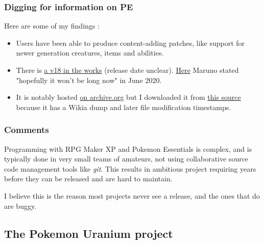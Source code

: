 \documentclass[11pt]{article}
\begin{document}
\subsubsection{Digging for information on PE}

Here are some of my findings :

\begin{itemize}
\item Users have been able to produce content-adding patches, like support for newer generation creatures, items and abilities.

\item There is \href{https://www.reddit.com/r/PokemonRMXP/comments/ckeaov/pok\%C3\%A9mon\_essentials\_v18\_progress\_report/}{a v18 in the works} (release date unclear). \href{https://www.reddit.com/r/PokemonRMXP/comments/hb6i6m/should\_i\_wait\_for\_essentials\_v18/}{Here} Maruno stated "hopefully it won't be long now" in June 2020.

\item It is notably hosted  \href{https://archive.org/details/PokmonEssentialsV17.220171015}{on archive.org} but I downloaded it from \href{https://www.youtube.com/watch?v=-aLAoeZnRDw}{this source} because it has a Wikia dump and later file modification timestamps. %
\end{itemize}






\subsubsection{Comments}


Programming with RPG Maker XP and Pokemon Essentials is complex, and is typically done in very small teams of amateurs, not using collaborative source code management tools like \textit{git}. This results in ambitious project requiring years before they can be released and are hard to maintain.

I believe this is the reason most projects never see a release, and the ones that do are buggy.



\subsection{The Pokemon Uranium project}
\end{document}
